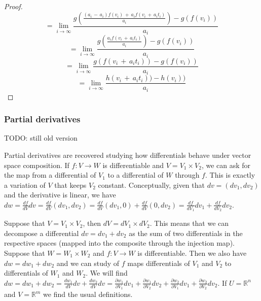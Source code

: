 \documentclass[11pt,letterpaper,fleqn]{memoir}
\begin{document}
\begin{proof}
$$
= \lim_{i \to \infty} \frac{g(\frac{(a_{i}\,-\,a_{i})f(v_{i})\,+\,a_{i}f(v_{i}\,+\,a_{i}t_{i})}{a_{i}}) - g(f(v_{i}))}{a_{i}} 
$$
$$
= \lim_{i \to \infty} \frac{g(\frac{a_{i}f(v_{i}\,+\,a_{i}t_{i})}{a_{i}}) - g(f(v_{i}))}{a_{i}} 
$$
$$
= \lim_{i \to \infty} \frac{g(f(v_{i}\,+\,a_{i}t_{i})) - g(f(v_{i}))}{a_{i}} 
$$
$$
= \lim_{i \to \infty} \frac{h(v_{i}\,+\,a_{i}t_{i})) - h(v_{i}))}{a_{i}} 
$$

\end{proof}


\subsubsection{Partial derivatives}

TODO: still old version

Partial derivatives are recovered studying how differentials behave under vector space composition. If $f : V \to W$ is differentiable and $V = V_1 \times V_2$, we can ask for the map from a differential of $V_1$ to a differential of $W$ through $f$. This is exactly a variation of $V$ that keeps $V_2$ constant. Conceptually, given that $dv = (dv_1, dv_2)$ and the derivative is linear, we have $dw = \frac{df}{dV} dv = \frac{df}{dV} (dv_1, dv_2) = \frac{df}{dV} (dv_1, 0) + \frac{df}{dV} (0, dv_2) = \frac{df}{dV_1} dv_1 + \frac{df}{dV_2} dv_2$.
	
Suppose that $V = V_1 \times V_2$, then $dV = dV_1 \times dV_2$. This means that we can decompose a differential $dv= dv_1 + dv_2$ as the sum of two differentials in the respective spaces (mapped into the composite through the injection map). Suppose that $W = W_1 \times W_2$ and $f : V \to W$ is differentiable. Then we also have $dw= dw_1 + dw_2$ and we can study of $f$ maps differentials of $V_1$ and $V_2$ to differentials of $W_1$ and $W_2$. We will find $dw = dw_1 + dw_2 = \frac{dw_1}{dV} dv + \frac{dw_2}{dV} dv = \frac{\partial w_1}{\partial V_1} dv_1 + \frac{\partial w_1}{\partial V_2} dv_2 + \frac{\partial w_2}{\partial V_1} dv_1 + \frac{\partial w_2}{\partial V_2} dv_2$. If $U = \mathbb{R}^n$ and $V = \mathbb{R}^m$ we find the usual definitions.
\end{document}

